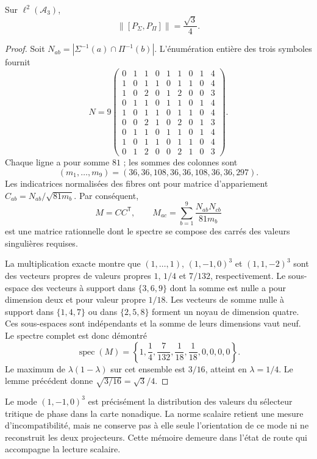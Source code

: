 \begin{proposition}
Sur \(\ell^2(\mathcal A_3)\),
\begin{equation}
 \|[P_\Sigma,P_\Pi]\|=\frac{\sqrt3}{4}.
 \label{x_reciprocidad:eq:el-prefactor}
\end{equation}
\end{proposition}
\begin{proof}
Soit \(N_{ab}=|\Sigma^{-1}(a)\cap\Pi^{-1}(b)|\). L'énumération entière
des trois symboles fournit
\[
 N=9\begin{pmatrix}
 0&1&1&0&1&1&0&1&4\\
 1&0&1&1&0&1&1&0&4\\
 1&0&2&0&1&2&0&0&3\\
 0&1&1&0&1&1&0&1&4\\
 1&0&1&1&0&1&1&0&4\\
 0&0&2&1&0&2&0&1&3\\
 0&1&1&0&1&1&0&1&4\\
 1&0&1&1&0&1&1&0&4\\
 0&1&2&0&0&2&1&0&3
 \end{pmatrix}.
\]
Chaque ligne a pour somme \(81\) ; les sommes des colonnes sont
\[
 (m_1,\ldots,m_9)=(36,36,108,36,36,108,36,36,297).
\]
Les indicatrices normalisées des fibres ont pour matrice
d'appariement \(C_{ab}=N_{ab}/\sqrt{81m_b}\). Par conséquent,
\[
 M=CC^{\mathsf T},\qquad
 M_{ac}=\sum_{b=1}^9\frac{N_{ab}N_{cb}}{81m_b}
\]
est une matrice rationnelle dont le spectre se compose des carrés des
valeurs singulières requises.

La multiplication exacte montre que \((1,\ldots,1)\),
\((1,-1,0)^3\) et \((1,1,-2)^3\) sont des vecteurs propres de valeurs propres
\(1\), \(1/4\) et \(7/132\), respectivement. Le sous-espace des
vecteurs à support dans \(\{3,6,9\}\) dont la somme est nulle a pour dimension
deux et pour valeur propre \(1/18\). Les vecteurs de somme nulle à support dans
\(\{1,4,7\}\) ou dans \(\{2,5,8\}\) forment un noyau de dimension
quatre. Ces sous-espaces sont indépendants et la somme de leurs dimensions vaut
neuf. Le spectre complet est donc démontré
\[
 \operatorname{spec}(M)=
 \left\{1,\frac14,\frac7{132},\frac1{18},\frac1{18},0,0,0,0\right\}.
\]
Le maximum de \(\lambda(1-\lambda)\) sur cet ensemble est \(3/16\), atteint en \(\lambda=1/4\). Le lemme précédent donne \(\sqrt{3/16}=\sqrt3/4\).
\end{proof}

Le mode \((1,-1,0)^3\) est précisément la distribution des valeurs du
sélecteur tritique de phase dans la carte nonadique. La norme scalaire retient
une mesure d'incompatibilité, mais ne conserve pas à elle seule
l'orientation de ce mode ni ne reconstruit les deux projecteurs. Cette mémoire
demeure dans l'état de route qui accompagne la lecture scalaire.

